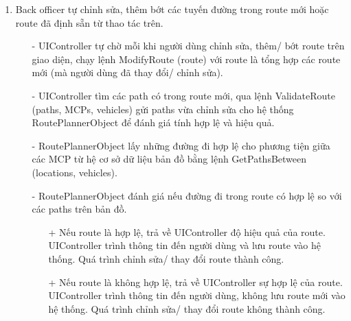 \begin{enumerate}
            \item Back officer tự chỉnh sửa, thêm bớt các tuyến đường trong route mới hoặc route đã định sẵn từ thao tác trên.
            \begin{itemize}
                \item[-] UIController tự chờ mỗi khi người dùng chỉnh sửa, thêm/ bớt route trên giao diện, chạy lệnh ModifyRoute (route) với route là tổng hợp các route mới (mà người dùng đã thay đổi/ chỉnh sửa).
                \item[-] UIController tìm các path có trong route mới, qua lệnh ValidateRoute (paths, MCPs, vehicles) gửi paths vừa chỉnh sửa cho hệ thống RoutePlannerObject để đánh giá tính hợp lệ và hiệu quả.
                \item[-] RoutePlannerObject lấy những đường đi hợp lệ cho phương tiện giữa các MCP từ hệ cơ sở dữ liệu bản đồ bằng lệnh GetPathsBetween (locations, vehicles).
                \item[-] RoutePlannerObject đánh giá nếu đường đi trong route có hợp lệ so với các paths trên bản đồ.
                \begin{itemize}
                    \item[+] Nếu route là hợp lệ, trả về UIController độ hiệu quả của route. UIController trình thông tin đến người dùng và lưu route vào hệ thống. Quá trình chỉnh sửa/ thay đổi route thành công.
                    \item[+] Nếu route là không hợp lệ, trả về UIController sự hợp lệ của route. UIController trình thông tin đến người dùng, không lưu route mới vào hệ thống. Quá trình chỉnh sửa/ thay đổi route không thành công.
                \end{itemize}
            \end{itemize}
        \end{enumerate}
